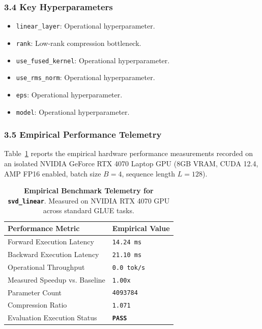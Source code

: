 \subsubsection*{3.4 Key Hyperparameters}
\begin{itemize}
    \item \texttt{linear\_layer}: Operational hyperparameter.
    \item \texttt{rank}: Low-rank compression bottleneck.
    \item \texttt{use\_fused\_kernel}: Operational hyperparameter.
    \item \texttt{use\_rms\_norm}: Operational hyperparameter.
    \item \texttt{eps}: Operational hyperparameter.
    \item \texttt{model}: Operational hyperparameter.
\end{itemize}

\subsubsection*{3.5 Empirical Performance Telemetry}
Table~\ref{tab:telemetry_svd_linear} reports the empirical hardware performance measurements recorded on an isolated NVIDIA GeForce RTX 4070 Laptop GPU (8GB VRAM, CUDA 12.4, AMP FP16 enabled, batch size $B=4$, sequence length $L=128$).

\begin{table}[h]
\centering
\small
\caption{\textbf{Empirical Benchmark Telemetry for \texttt{svd\_linear}}. Measured on NVIDIA RTX 4070 GPU across standard GLUE tasks.}
\label{tab:telemetry_svd_linear}
\begin{tabularx}{\columnwidth}{lX}
\toprule
\textbf{Performance Metric} & \textbf{Empirical Value} \\
\midrule
Forward Execution Latency & \texttt{14.24 ms} \\
Backward Execution Latency & \texttt{21.10 ms} \\
Operational Throughput & \texttt{0.0 tok/s} \\
Measured Speedup vs. Baseline & \texttt{1.00x} \\
Parameter Count & \texttt{4093784} \\
Compression Ratio & \texttt{1.071} \\
Evaluation Execution Status & \textbf{\texttt{PASS}} \\
\bottomrule
\end{tabularx}
\end{table}

